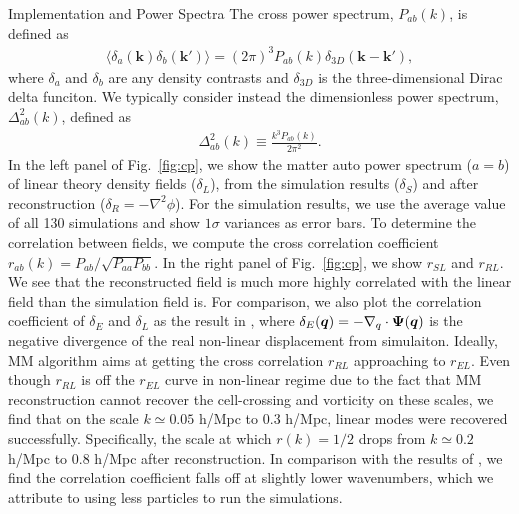 \begin{section}{Implementation and Power Spectra}
 The cross power spectrum, $P_{ab}(k)$, is defined as
 \begin{align}
   \langle \delta_a(\bm{k})\delta_b(\bm{k'}) \rangle =
   (2\pi)^3 P_{ab}(k) \delta_{3D}(\bm{k}-\bm{k'}),
 \end{align}
 where $\delta_{a}$ and $\delta_{b}$ are any density contrasts and
 $\delta_{3D}$ is the three-dimensional Dirac delta funciton. We typically consider instead
 the dimensionless power spectrum, $\Delta_{ab}^2(k)$, defined as
 \begin{align}
   \Delta_{ab}^2(k) \equiv \frac{k^3 P_{ab}(k)}{2\pi ^2}.
 \end{align}
 In the left panel of Fig.~\ref{fig:cp}, we show the matter auto power
 spectrum ($a=b$) of linear theory density fields ($\delta_L$), from
 the simulation results ($\delta_S$) and after reconstruction
 ($\delta_R=-\nabla^2\phi$).  For the simulation
 results, we use the average value of all 130 simulations and show
 $1\sigma$ variances as error bars.  To determine the correlation
 between fields, we compute the cross correlation coefficient
 $r_{ab}(k) = P_{ab}/\sqrt{P_{aa}P_{bb}}$.  In the right panel of
 Fig.~\ref{fig:cp}, we show $r_{SL}$ and $r_{RL}$.  We see that the
 reconstructed field is much more highly correlated with the linear
 field than the simulation field is.  For comparison, we also plot the 
 correlation coefficient of $\delta_E$ 
 and $\delta_L$ as the result in \cite{bib:Yu2016}, 
 where $\delta_E(\boldsymbol{q})= - \nabla_q \cdot \boldsymbol{\Psi}(\boldsymbol{q})$ is the 
 negative divergence of the real non-linear displacement from simulaiton. 
 Ideally, MM algorithm aims at getting the cross correlation $r_{RL}$ approaching to $r_{EL}$. 
 Even though $r_{RL}$ is off the $r_{EL}$ curve in non-linear regime due to the fact that MM reconstruction 
 cannot recover the cell-crossing and vorticity on these scales, we find that on the scale $k\simeq 0.05$ 
 h/Mpc to $0.3$ h/Mpc, linear modes were recovered successfully.
 Specifically, the scale at which $r(k)=1/2$ drops from $k\simeq 0.2$ h/Mpc to
 $0.8$ h/Mpc after reconstruction.  In comparison with the results of \citet{bib:ZhuH2016},
 we find the correlation coefficient falls off at slightly lower
 wavenumbers, which we attribute to using less particles to run the simulations.


\end{section}
